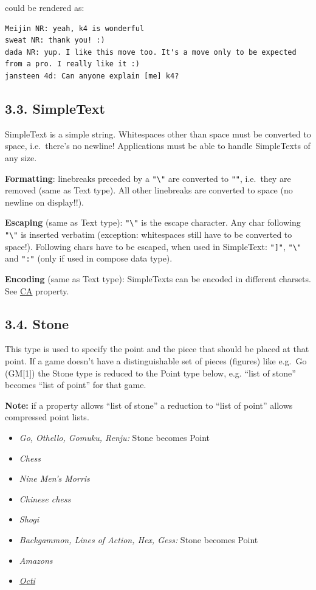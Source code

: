 could be rendered as:

\begin{verbatim}
Meijin NR: yeah, k4 is wonderful
sweat NR: thank you! :)
dada NR: yup. I like this move too. It's a move only to be expected
from a pro. I really like it :)
jansteen 4d: Can anyone explain [me] k4?
\end{verbatim}

\subsection{3.3. SimpleText}\label{simpletext}

SimpleText is a simple string. Whitespaces other than space must be
converted to space, i.e.~there's no newline! Applications must be able
to handle SimpleTexts of any size.

\textbf{Formatting}: linebreaks preceded by a
\texttt{"\textbackslash{}"} are converted to \texttt{""}, i.e.~they are
removed (same as Text type). All other linebreaks are converted to space
(no newline on display!!).

\textbf{Escaping} (same as Text type): \texttt{"\textbackslash{}"} is
the escape character. Any char following \texttt{"\textbackslash{}"} is
inserted verbatim (exception: whitespaces still have to be converted to
space!). Following chars have to be escaped, when used in SimpleText:
\texttt{"{]}"}, \texttt{"\textbackslash{}"} and \texttt{":"} (only if
used in compose data type).

\textbf{Encoding} (same as Text type): SimpleTexts can be encoded in
different charsets. See
\href{https://red-bean.com/sgf/properties.html\#CA}{CA} property.

\subsection{3.4. Stone}\label{stone}

This type is used to specify the point and the piece that should be
placed at that point. If a game doesn't have a distinguishable set of
pieces (figures) like e.g.~Go (GM{[}1{]}) the Stone type is reduced to
the Point type below, e.g. ``list of stone'' becomes ``list of point''
for that game.

\textbf{Note:} if a property allows ``list of stone'' a reduction to
``list of point'' allows compressed point lists.

\begin{itemize}
\item
  \emph{Go, Othello, Gomuku, Renju:} Stone becomes Point
\item
  \emph{Chess}
\item
  \emph{Nine Men's Morris}
\item
  \emph{Chinese chess}
\item
  \emph{Shogi}
\item
  \emph{Backgammon, Lines of Action, Hex, Gess:} Stone becomes Point
\item
  \emph{Amazons}
\item
  \emph{\href{https://red-bean.com/sgf/octi.html\#types}{Octi}}
\end{itemize}

